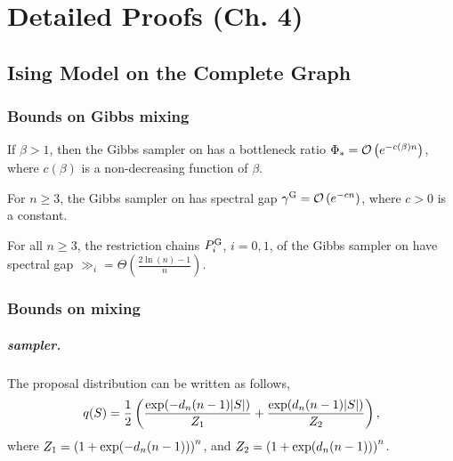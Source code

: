 \chapter{Detailed Proofs (Ch. 4)}

\section{Ising Model on the Complete Graph}

\subsection{Bounds on Gibbs mixing}
\let\oldthetheorem\thetheorem
\renewcommand{\thetheorem}{B1}
\begin{theorem} \label{lem:gibbs_exp}
  If $\beta > 1$, then the Gibbs sampler on \isingb{} has a bottleneck ratio $\Phi_{*} = \mathcal{O}\left(e^{-c(\beta)n}\right)$, where $c(\beta)$ is a non-decreasing function of $\beta$.
\end{theorem}
\let\thetheorem\oldthetheorem

\setcounter{cor}{0}
\begin{cor}
  For $n \geq 3$, the Gibbs sampler on \ising{} has spectral gap $\gamma^{\mathrm{G}} = \mathcal{O}\left(e^{-cn}\right)$, where $c > 0$ is a constant.
\end{cor}

\begin{cor}
  For all $n \geq 3$, the restriction chains $P^{\mathrm{G}}_i$, $i = 0, 1$, of the Gibbs sampler on \ising{} have spectral gap $\gg_i = \Theta\left(\displaystyle\frac{2\ln(n) - 1}{n}\right)$.
\end{cor}

\subsection{Bounds on \Ms{} mixing}
\paragraph{\Ms{} sampler.}
The proposal distribution can be written as follows,
\begin{align} \label{eq:qdef}
  q(S) = \frac12\left( \frac{\exp(-d_n (n-1)|S|)}{Z_1} + \frac{\exp(d_n (n-1)|S|)}{Z_2}\right),
\end{align}
where $Z_1 = \left(1 + \exp(-d_n(n-1))\right)^n$, and $Z_2 = \left(1 + \exp(d_n(n-1))\right)^n$.

